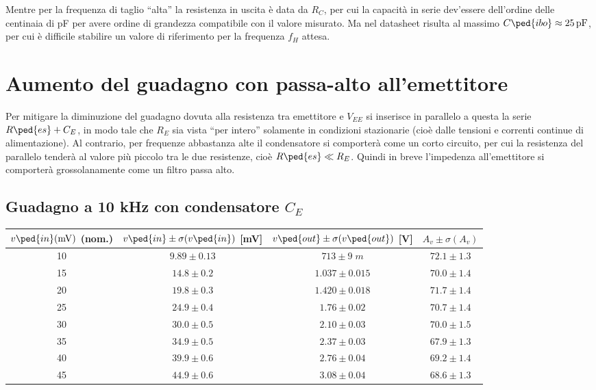 \documentclass[10pt,a4paper]{article}
\begin{document}
Mentre per la frequenza di taglio ``alta'' la resistenza in uscita è data
da $R_C$, per cui la capacità in serie dev'essere dell'ordine delle centinaia
di pF per avere ordine di grandezza compatibile con il valore misurato.
Ma nel datasheet risulta al massimo $C\ped{ibo} \approx \SI{25}{p\F}$, per cui
è difficile stabilire un valore di riferimento per la frequenza $f_H$ attesa.

\section{Aumento del guadagno con passa-alto all'emettitore}
Per mitigare la diminuzione del guadagno dovuta alla resistenza tra emettitore
e $V_{EE}$ si inserisce in parallelo a questa la serie $R\ped{es} + C_E$,
in modo tale che $R_E$ sia vista ``per intero'' solamente in condizioni
stazionarie (cioè dalle tensioni e correnti continue di alimentazione).
Al contrario, per frequenze abbastanza alte il condensatore si comporterà come
un corto circuito, per cui la resistenza del parallelo tenderà al valore più
piccolo tra le due resistenze, cioè $R\ped{es} \ll R_E$.
Quindi in breve l'impedenza all'emettitore si comporterà grossolanamente
come un filtro passa alto.

\subsection{Guadagno a 10 kHz con condensatore $C_E$}
\begin{table}[htb]
\centering
\begin{tabular}{cccc}
\toprule
$v\ped{in}(\si{m\V})$ (nom.) & $v\ped{in} \pm \sigma(v\ped{in})$ [mV] & $v\ped{out} \pm \sigma(v\ped{out})$ [V] & $A_v \pm \sigma(A_v)$ \\
\midrule
\midrule
10 & $9.89 \pm 0.13$ & $713 \pm 9 \; \si{m}$ & $72.1 \pm 1.3$ \\
15 & $14.8 \pm 0.2$ & $1.037 \pm 0.015$ & $70.0 \pm 1.4$ \\
20 & $19.8 \pm 0.3$ & $1.420 \pm 0.018$ & $71.7 \pm 1.4$ \\
25 & $24.9 \pm 0.4$ & $1.76 \pm 0.02$ & $ 70.7 \pm 1.4$ \\
30 & $30.0 \pm 0.5$ & $2.10 \pm 0.03$ & $ 70.0 \pm 1.5$ \\
35 & $34.9 \pm 0.5$ & $2.37 \pm 0.03$ & $ 67.9 \pm 1.3$ \\
40 & $39.9 \pm 0.6$ & $2.76 \pm 0.04$ & $ 69.2 \pm 1.4$ \\
45 & $44.9 \pm 0.6$ & $3.08 \pm 0.04$ & $ 68.6 \pm 1.3$ \\
\bottomrule
\end{tabular}
\end{table}
\end{document}

